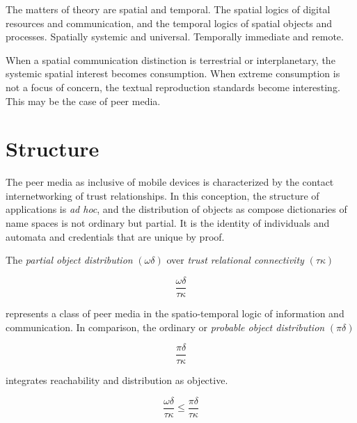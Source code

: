 \documentclass[12pt,twocolumn]{article}
\begin{document}
The matters of theory are spatial and temporal.  The spatial logics of
digital resources and communication, and the temporal logics of
spatial objects and processes.  Spatially systemic and universal.
Temporally immediate and remote.

When a spatial communication distinction is terrestrial or
interplanetary, the systemic spatial interest becomes consumption.
When extreme consumption is not a focus of concern, the textual
reproduction standards become interesting.  This may be the case of
peer media.

\section{Structure}

The peer media as inclusive of mobile devices is characterized by the
contact internetworking of trust relationships.  In this conception,
the structure of applications is {\it ad hoc}, and the distribution of
objects as compose dictionaries of name spaces is not ordinary but
partial.  It is the identity of individuals and automata and
credentials that are unique by proof.

The {\it partial object distribution} \((\omega\delta)\) over {\it trust relational connectivity} \((\tau\kappa)\) 

 $$
 \frac{\omega\delta}{\tau\kappa}
 $$

represents a class of peer media in the spatio-temporal logic of
information and communication.  In comparison, the ordinary or {\it
  probable object distribution} \((\pi\delta)\) 

 $$
 \frac{\pi\delta}{\tau\kappa}
 $$

integrates reachability and distribution as objective.

 $$
 \frac{\omega\delta}{\tau\kappa} \le \frac{\pi\delta}{\tau\kappa}
 $$



\appendix




\end{document}
